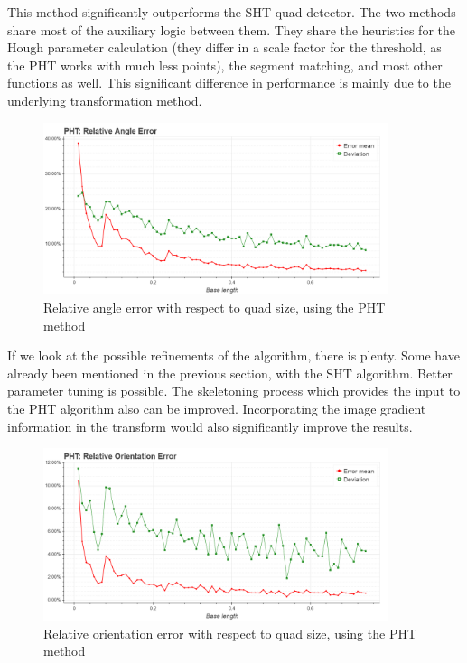 This method significantly outperforms the SHT quad detector.
The two methods share most of the auxiliary logic between them.
They share the heuristics for the Hough parameter calculation (they differ in a scale factor for the threshold, as the PHT works with much less points), the segment matching, and most other functions as well.
This significant difference in performance is mainly due to the underlying transformation method.
\begin{figure}[ht]
	\centering
	\includegraphics[width=0.9\textwidth]{figures/plots/pht_relative_angle_error.png}
	\caption{Relative angle error with respect to quad size, using the PHT method}
	\label{fig:phtRelAngleErr}
\end{figure}

If we look at the possible refinements of the algorithm, there is plenty.
Some have already been mentioned in the previous section, with the SHT algorithm.
Better parameter tuning is possible.
The skeletoning process which provides the input to the PHT algorithm also can be improved.
Incorporating the image gradient information in the transform would also significantly improve the results.
\begin{figure}[ht]
	\centering
	\includegraphics[width=0.9\textwidth]{figures/plots/pht_relative_orientation_error.png}
	\caption{Relative orientation error with respect to quad size, using the PHT method}
	\label{fig:phtRelOrientErr}
\end{figure}

